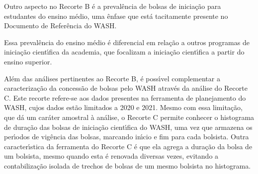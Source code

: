 \documentclass[
12pt,		%
openright,	%
twoside,  %
a4paper,			%
chapter=TITLE,		%
english,			%
french,				%
spanish,			%
brazil				%
]{USPSC-classe/USPSC}
\begin{document}
Outro aspecto no Recorte B \'e a preval\^encia de bolsas de inicia\c{c}\~ao para estudantes do ensino m\'edio, uma \^enfase que est\'a tacitamente presente no Documento de Refer\^encia do WASH.


















\noindent\begin{center}\mbox{\centering{}}\end{center}


Essa preval\^encia do ensino m\'edio \'e diferencial em rela\c{c}\~ao a outros programas de inicia\c{c}\~ao cient\'{\i}fica da academia, que focalizam a inicia\c{c}\~ao cient\'{\i}fica a partir do ensino superior.

















Al\'em das an\'alises pertinentes ao Recorte B, \'e poss\'{\i}vel complementar a caracteriza\c{c}\~ao da concess\~ao de bolsas pelo WASH atrav\'es da an\'alise do Recorte C. Este recorte refere-se aos dados presentes na ferramenta de planejamento do WASH, cujos dados est\~ao limitados a 2020 e 2021. Mesmo com essa limita\c{c}\~ao, que d\'a um car\'ater amostral \`a an\'alise, o Recorte C permite conhecer o histograma de dura\c{c}\~ao das bolsas de inicia\c{c}\~ao cient\'{\i}fica do WASH, uma vez que armazena os per\'{\i}odos de vig\^encia das bolsas, marcando in\'{\i}cio e fim para cada bolsista. Outra caracter\'{\i}stica da ferramenta do Recorte C \'e que ela agrega a dura\c{c}\~ao da bolsa de um bolsista, mesmo quando esta \'e renovada diversas vezes, evitando a contabiliza\c{c}\~ao isolada de trechos de bolsas de um mesmo bolsista no histograma.
\end{document}
